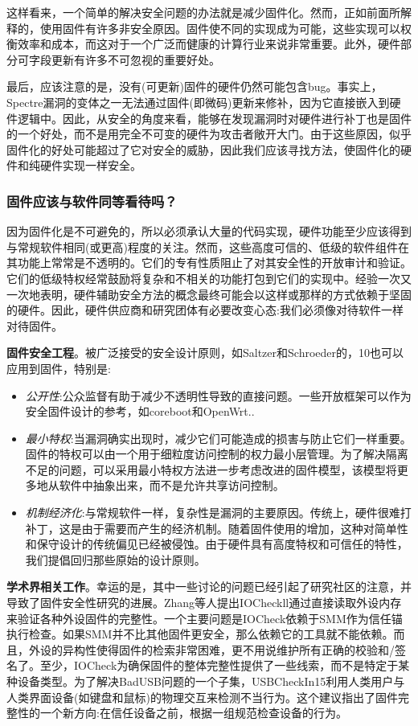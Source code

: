 这样看来，一个简单的解决安全问题的办法就是减少固件化。然而，正如前面所解释的，使用固件有许多非安全原因。固件使不同的实现成为可能，这些实现可以权衡效率和成本，而这对于一个广泛而健康的计算行业来说非常重要。此外，硬件部分可字段更新有许多不可忽视的重要好处。

最后，应该注意的是，没有(可更新)固件的硬件仍然可能包含bug。事实上，Spectre漏洞的变体之一无法通过固件(即微码)更新来修补，因为它直接嵌入到硬件逻辑中。因此，从安全的角度来看，能够在发现漏洞时对硬件进行补丁也是固件的一个好处，而不是用完全不可变的硬件为攻击者敞开大门。由于这些原因，似乎固件化的好处可能超过了它对安全的威胁，因此我们应该寻找方法，使固件化的硬件和纯硬件实现一样安全。

\subsubsection{固件应该与软件同等看待吗？}

因为固件化是不可避免的，所以必须承认大量的代码实现，硬件功能至少应该得到与常规软件相同(或更高)程度的关注。然而，这些高度可信的、低级的软件组件在其功能上常常是不透明的。它们的专有性质阻止了对其安全性的开放审计和验证。它们的低级特权经常鼓励将复杂和不相关的功能打包到它们的实现中。经验一次又一次地表明，硬件辅助安全方法的概念最终可能会以这样或那样的方式依赖于坚固的硬件。因此，硬件供应商和研究团体有必要改变心态:我们必须像对待软件一样对待固件。

\textbf{固件安全工程}。被广泛接受的安全设计原则，如Saltzer和Schroeder的，10也可以应用到固件，特别是:

\begin{itemize}
    \item \textit{公开性}:公众监督有助于减少不透明性导致的直接问题。一些开放框架可以作为安全固件设计的参考，如coreboot和OpenWrt..

    \item \textit{最小特权}:当漏洞确实出现时，减少它们可能造成的损害与防止它们一样重要。固件的特权可以由一个用于细粒度访问控制的权力最小层管理。为了解决隔离不足的问题，可以采用最小特权方法进一步考虑改进的固件模型，该模型将更多地从软件中抽象出来，而不是允许共享访问控制。

    \item \textit{机制经济化}:与常规软件一样，复杂性是漏洞的主要原因。传统上，硬件很难打补丁，这是由于需要而产生的经济机制。随着固件使用的增加，这种对简单性和保守设计的传统偏见已经被侵蚀。由于硬件具有高度特权和可信任的特性，我们提倡回归那些原始的设计原则。
\end{itemize}

\textbf{学术界相关工作}。幸运的是，其中一些讨论的问题已经引起了研究社区的注意，并导致了固件安全性研究的进展。Zhang等人提出IOCheckll通过直接读取外设内存来验证各种外设固件的完整性。一个主要问题是IOCheck依赖于SMM作为信任锚执行检查。如果SMM并不比其他固件更安全，那么依赖它的工具就不能依赖。而且，外设的异构性使得固件的检索非常困难，更不用说维护所有正确的校验和/签名了。至少，IOCheck为确保固件的整体完整性提供了一些线索，而不是特定于某种设备类型。为了解决BadUSB问题的一个子集，USBCheckIn15利用人类用户与人类界面设备(如键盘和鼠标)的物理交互来检测不当行为。这个建议指出了固件完整性的一个新方向:在信任设备之前，根据一组规范检查设备的行为。

